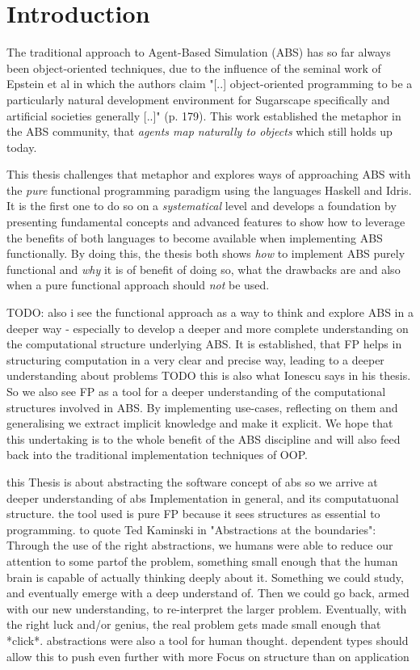 \chapter{Introduction}
\label{ch:intro}

The traditional approach to Agent-Based Simulation (ABS) has so far always been object-oriented techniques, due to the influence of the seminal work of Epstein et al \cite{epstein_growing_1996} in which the authors claim "[..] object-oriented programming to be a particularly natural development environment for Sugarscape specifically and artificial societies generally [..]" (p. 179). This work established the metaphor in the ABS community, that \textit{agents map naturally to objects} \cite{north_managing_2007} which still holds up today.

This thesis challenges that metaphor and explores ways of approaching ABS with the \textit{pure} functional programming paradigm using the languages Haskell and Idris. It is the first one to do so on a \textit{systematical} level and develops a foundation by presenting fundamental concepts and advanced features to show how to leverage the benefits of both languages \cite{hudak_history_2007, brady_idris_2013} to become available when implementing ABS functionally. By doing this, the thesis both shows \textit{how} to implement ABS purely functional and \textit{why} it is of benefit of doing so, what the drawbacks are and also when a pure functional approach should \textit{not} be used. 

TODO: also i see the functional approach as a way to think and explore ABS in a deeper way - especially to develop a deeper and more complete understanding on the computational structure underlying ABS. It is established, that FP helps in structuring computation in a very clear and precise way, leading to a deeper understanding about problems TODO this is also what Ionescu says in his thesis. So we also see FP as a tool for a deeper understanding of the computational structures involved in ABS. By implementing use-cases, reflecting on them and generalising we extract implicit knowledge and make it explicit. We hope that this undertaking is to the whole benefit of the ABS discipline and will also feed back into the traditional implementation techniques of OOP.

this Thesis is about abstracting the software concept of abs so we arrive at deeper understanding of abs Implementation in general, and its computatuonal structure. the tool used is pure FP because it sees structures as essential to programming. to quote Ted Kaminski in "Abstractions at the boundaries": Through the use of the right abstractions, we humans were able to reduce our attention to some partof the problem, something small enough that the human brain is capable of actually thinking deeply about it. Something we could study, and eventually emerge with a deep understand of. Then we could go back, armed with our new understanding, to re-interpret the larger problem. Eventually, with the right luck and/or genius, the real problem gets made small enough that *click*. abstractions were also a tool for human thought.
dependent types should allow this to push even further with more Focus on structure than on application

